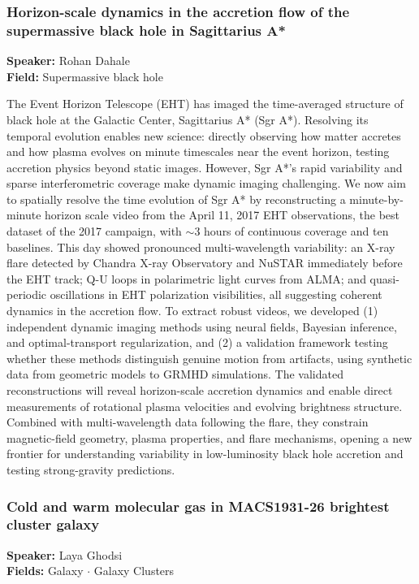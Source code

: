 \hypertarget{abstract-talk-19}{}\label{abstract-page-talk-19}
\subsubsection*{Horizon-scale dynamics in the accretion flow of the supermassive black hole in Sagittarius A*}
\textbf{Speaker:} Rohan Dahale\\
\textbf{Field:} Supermassive black hole

The Event Horizon Telescope (EHT) has imaged the time-averaged structure of black hole at the Galactic Center, Sagittarius A* (Sgr A*). Resolving its temporal evolution enables new science: directly observing how matter accretes and how plasma evolves on minute timescales near the event horizon, testing accretion physics beyond static images. However, Sgr A*'s rapid variability and sparse interferometric coverage make dynamic imaging challenging. We now aim to spatially resolve the time evolution of Sgr A* by reconstructing a minute-by-minute horizon scale video from the April 11, 2017 EHT observations, the best dataset of the 2017 campaign, with $\sim$3 hours of continuous coverage and ten baselines. This day showed pronounced multi-wavelength variability: an X-ray flare detected by Chandra X-ray Observatory and NuSTAR immediately before the EHT track; Q-U loops in polarimetric light curves from ALMA; and quasi-periodic oscillations in EHT polarization visibilities, all suggesting coherent dynamics in the accretion flow. To extract robust videos, we developed (1) independent dynamic imaging methods using neural fields, Bayesian inference, and optimal-transport regularization, and (2) a validation framework testing whether these methods distinguish genuine motion from artifacts, using synthetic data from geometric models to GRMHD simulations. The validated reconstructions will reveal horizon-scale accretion dynamics and enable direct measurements of rotational plasma velocities and evolving brightness structure. Combined with multi-wavelength data following the flare, they constrain magnetic-field geometry, plasma properties, and flare mechanisms, opening a new frontier for understanding variability in low-luminosity black hole accretion and testing strong-gravity predictions.

\hypertarget{abstract-talk-145}{}\label{abstract-page-talk-145}
\subsubsection*{Cold and warm molecular gas in MACS1931-26 brightest cluster galaxy}
\textbf{Speaker:} Laya Ghodsi\\
\textbf{Fields:} Galaxy $\cdot$ Galaxy Clusters

